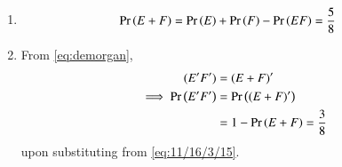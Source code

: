 \begin{enumerate}
    \item 
	    \begin{align}
     \pr{E+F}&= \pr{E} + \pr{F} - \pr{EF}
    = \frac{5}{8}
	\label{eq:11/16/3/15}
\end{align}
\item From 
	\eqref{eq:demorgan},
\begin{align}
	(E^\prime F^\prime) &= (E+F)^\prime
    \\
\implies     \Pr\left(E^\prime F^\prime\right) &= \Pr\left((E+F)^\prime\right)
\\
	&= 1 - \Pr\left(E+F\right) 
    = \frac{3}{8}
\end{align}
upon substituting from 
	\eqref{eq:11/16/3/15}.
\end{enumerate}
